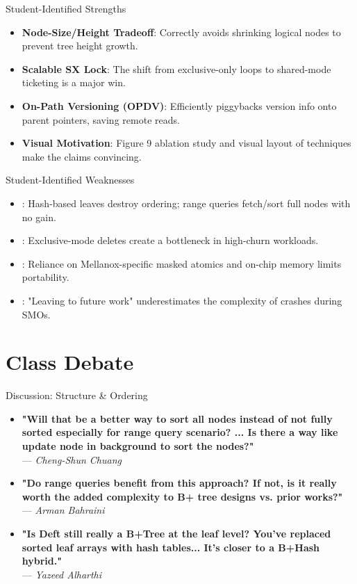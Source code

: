 \documentclass[aspectratio=169,10pt]{beamer}
\newcommand{\hl}[1]{\textcolor{VTMaroon}{\textbf{#1}}}
\begin{document}
\begin{frame}[t]{Student-Identified Strengths}
\begin{itemize}
    \item \hl{Node-Size/Height Tradeoff}: Correctly avoids shrinking logical nodes to prevent tree height growth.
    \item \hl{Scalable SX Lock}: The shift from exclusive-only loops to shared-mode ticketing is a major win.
    \item \hl{On-Path Versioning (OPDV)}: Efficiently piggybacks version info onto parent pointers, saving remote reads.
    \item \hl{Visual Motivation}: Figure 9 ablation study and visual layout of techniques make the claims convincing.
\end{itemize}
\end{frame}

\begin{frame}[t]{Student-Identified Weaknesses}
\begin{itemize}
    \item {}: Hash-based leaves destroy ordering; range queries fetch/sort full nodes with no gain.
    \item {}: Exclusive-mode deletes create a bottleneck in high-churn workloads.
    \item {}: Reliance on Mellanox-specific masked atomics and on-chip memory limits portability.
    \item {}: "Leaving to future work" underestimates the complexity of crashes during SMOs.
\end{itemize}
\end{frame}


\section{Class Debate}

\begin{frame}[t]{Discussion: Structure \& Ordering}
\begin{itemize}
    \item \textbf{"Will that be a better way to sort all nodes instead of not fully sorted especially for range query scenario? ... Is there a way like update node in background to sort the nodes?"} \\ --- \textit{Cheng-Shun Chuang}
    \item \textbf{"Do range queries benefit from this approach? If not, is it really worth the added complexity to B+ tree designs vs. prior works?"} \\ --- \textit{Arman Bahraini}
    \item \textbf{"Is Deft still really a B+Tree at the leaf level? You've replaced sorted leaf arrays with hash tables... It's closer to a B+Hash hybrid."} \\ --- \textit{Yazeed Alharthi}
\end{itemize}
\end{frame}
\end{document}

